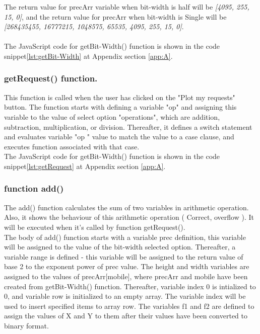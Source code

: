 \documentclass[11pt]{article}
\begin{document}
The return value for precArr variable when bit-width is half will be \textit{[4095, 255, 15, 0]}, and the return value for precArr when bit-width is Single will be \textit{[268435455, 16777215, 1048575, 65535, 4095, 255, 15, 0]}.\\
\\The JavaScript code for getBit-Width() function is shown in the code snippet\ref{lst:getBit-Width} at Appendix section \ref{app:A}.\\

\subsubsection{getRequest() function.} 
This function is called when the user has clicked on the "Plot my requests" button. The function starts with defining a variable "op" and assigning this variable to the value of select option "operations", which are addition, subtraction, multiplication, or division. Thereafter, it defines a switch statement and evaluates variable "op " value to match the value to a case clause, and executes function associated with that case.\\
The JavaScript code for getBit-Width() function is shown in the code snippet\ref{lst:getRequest} at Appendix section \ref{app:A}.\\

\subsubsection{function add()}
The add() function calculates the sum of two variables in arithmetic operation. Also, it shows the behaviour of this arithmetic operation ( Correct, overflow ). It will be executed when it's called by function getRequest().\\
The body of add() function starts with a variable prec definition, this variable will be assigned to the value of the bit-width selected option. Thereafter, a variable range is defined - this variable will be assigned to the return value of base 2 to the exponent power of prec value.
The height and width variables are assigned to the values of precArr[mobile], where precArr and mobile have been created from getBit-Width() function.
Thereafter, variable index 0 is intialized to 0, and variable row is initialized to an empty array. The variable index will be used to insert specified items to array row. The variables f1 and f2 are defined to assign the values of X and Y to them after their values have been converted to binary format.\\
\end{document}
